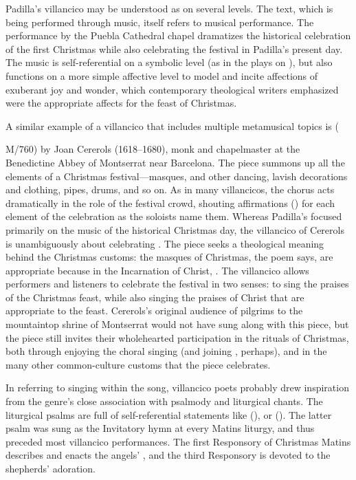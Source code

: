 Padilla's villancico may be understood as  on 
several levels.
The text, which is being performed through music, itself refers to musical 
performance.
The performance by the Puebla Cathedral chapel dramatizes the historical 
celebration of the first Christmas while also celebrating the festival in 
Padilla's present day.
The music is self-referential on a symbolic level (as in the plays on 
), but also functions on a more simple affective level to model and 
incite affections of exuberant joy and wonder, which contemporary theological 
writers emphasized were the appropriate affects for the feast of Christmas. %

A similar example of a villancico that includes multiple metamusical topics is 
 (\signature{E-Bbc}{M/760}) by Joan 
Cererols (1618--1680), monk and chapelmaster at the Benedictine Abbey of 
Montserrat near Barcelona.%
  \autocite[81--94]{Cererols:MEM-VC}
The piece summons up all the elements of a Christmas festival---masques, 
 and other dancing, lavish decorations and clothing, pipes, 
drums, and so on.
As in many villancicos, the chorus acts dramatically in the role of the 
festival crowd, shouting affirmations () for each element of 
the celebration as the soloists name them.
Whereas Padilla's  focused primarily on 
the music of the historical Christmas day, the villancico of Cererols is 
unambiguously about celebrating .
The piece seeks a theological meaning behind the Christmas customs: the masques 
of Christmas, the poem says, are appropriate because in the Incarnation of 
Christ, . 
The villancico allows performers and listeners to celebrate the festival in two 
senses: to sing the praises of the Christmas feast, while also singing the 
praises of Christ that are appropriate to the feast.
Cererols's original audience of pilgrims to the mountaintop shrine of 
Montserrat would not have sung along with this piece, but the piece still 
invites their wholehearted participation in the rituals of Christmas, both 
through enjoying the choral singing (and joining , perhaps), 
and in the many other common-culture customs that the piece celebrates.

In referring to singing within the song, villancico poets probably drew 
inspiration from the genre's close association with psalmody and liturgical 
chants.
The liturgical psalms are full of self-referential statements like  (), or  ().
The latter psalm was sung as the Invitatory hymn at every Matins liturgy, and 
thus preceded most villancico performances.
The first Responsory of Christmas Matins describes and enacts the angels' 
, and the third Responsory is devoted to the shepherds' 
adoration.%
  \autocite[172--173]{Catholic:Breviarium1631}

